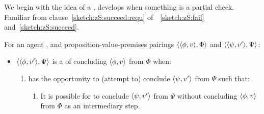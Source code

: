 \begin{note}[\requ{3}]
  We begin with the idea of a \requ{}, develops when something is a partial check.
  Familiar from clause~\autoref{sketch:zS:succeed:requ} of~~\ref{sketch:zS:fail} and~\ref{sketch:zS:succeed}.

  \begin{idea}[A \requ{0}]
    \label{idea:requ}
    For an agent \vAgent{}, and proposition-value-premises pairings \(\langle \langle \phi, v \rangle, \Phi \rangle\) and \(\langle \langle \psi, v' \rangle, \Psi \rangle\):

    \begin{itemize}
    \item
      \(\langle \langle \phi, v' \rangle, \Psi \rangle\) is a \emph{\requ{}} of concluding \(\langle \phi, v \rangle\) from \(\Phi\) when:
      \begin{enumerate}[label=\arabic*., ref=\named{R:\arabic*}]
      \item
        \label{idea:requ:pool}
        \vAgent{} has the opportunity to (attempt to) conclude \(\langle \psi, v' \rangle\) from \(\Psi\) such that:
        \begin{enumerate}[label=\roman*., ref=\named{R:1\roman*}]
        \item
          \label{idea:requ:pool:int}
          It is possible for \vAgent{} to conclude \(\langle \psi, v' \rangle\) from \(\Psi\) without concluding \(\langle \phi, v \rangle\) from \(\Phi\) as an intermediary step.
        \end{enumerate}
      \end{enumerate}


\end{itemize}
\end{idea}
\end{note}
